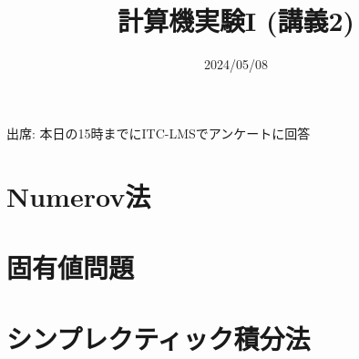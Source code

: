 \documentclass[10pt,dvipdfmx]{beamer}
\title{計算機実験I (講義2)}
\date{2024/05/08}
\begin{document}
\begin{frame}
  \titlepage
  \tableofcontents
  出席: 本日の15時までにITC-LMSでアンケートに回答
\end{frame}



\section{Numerov法}





\section{固有値問題}




\section{シンプレクティック積分法}






% 
% 
% 





\section{}

\end{document}
